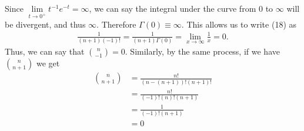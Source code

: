 Since $\lim\limits_{t\rightarrow 0^+}t^{-1}e^{-t}=\infty$, we can say the integral under the curve from $0$ to $\infty$ will be divergent, and thus $\infty$. Therefore $\Gamma(0)\equiv\infty$. This allows us to write (18) as
\begin{align}
	\frac{1}{(n+1)(-1)!} = \frac{1}{(n+1)\Gamma(0)}=\lim\limits_{x\rightarrow \infty}\frac{1}{x}=0.
\end{align}
Thus, we can say that ${{n}\choose{-1}}=0$. Similarly, by the same process, if we have ${{n}\choose{n+1}}$ we get
\begin{align}
	{{n}\choose{n+1}}&=\frac{n!}{(n-(n+1))!(n+1)!}\\
	&=\frac{n!}{(-1)!(n)!(n+1)}\\
	&=\frac{1}{(-1)!(n+1)}\\
	&=0
\end{align}

